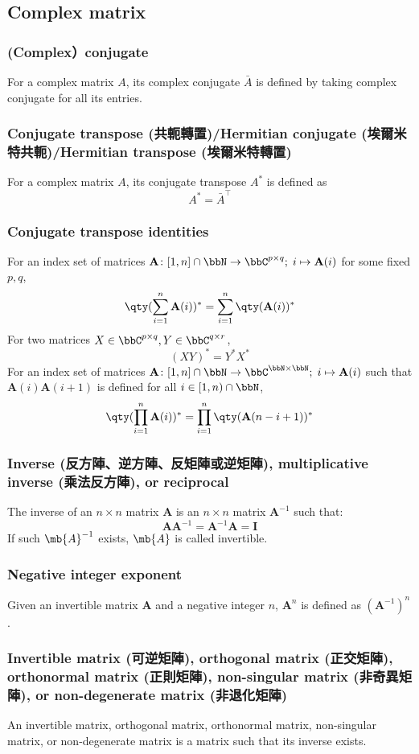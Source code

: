 \documentclass[a4paper,12pt]{report}
\begin{document}
\subsection{Complex matrix}
\subsubsection{(Complex）conjugate}
For a complex matrix $A$, its complex conjugate $\bar{A}$ is defined by taking complex conjugate for all its entries.
\subsubsection{Conjugate transpose (共軛轉置)/Hermitian conjugate (埃爾米特共軛)/Hermitian transpose (埃爾米特轉置)}
For a complex matrix $A$, its conjugate transpose $A^*$ is defined as
\[A^*=\bar{A}^\top\]
\subsubsection{Conjugate transpose identities}
For an index set of matrices $\mathbf{A}\colon[1,n]\cap\bbN\to\bbC^{p\times q};\;i\mapsto\mathbf{A}(i)$ for some fixed $p,q$,
\[\qty(\sum_{i=1}^n\mathbf{A}(i))^*=\sum_{i=1}^n\qty(\mathbf{A}(i))^*\]
For two matrices $X\in\bbC^{p\times q},Y\in\bbC^{q\times r}$,
\[(XY)^{*}=Y^{*}X^{*}\]
For an index set of matrices $\mathbf{A}\colon[1,n]\cap\bbN\to\bbC^{\bbN\times\bbN};\;i\mapsto\mathbf{A}(i)$ such that $\mathbf{A}(i)\mathbf{A}(i+1)$ is defined for all $i\in[1,n)\cap\bbN$,
\[\qty(\prod_{i=1}^n\mathbf{A}(i))^*=\prod_{i=1}^n\qty(\mathbf{A}(n-i+1))^*\]
\subsubsection{Inverse (反方陣、逆方陣、反矩陣或逆矩陣), multiplicative inverse (乘法反方陣), or reciprocal}
The inverse of an $n\times n$ matrix $\mathbf{A}$ is an $n\times n$ matrix $\mathbf{A}^{-1}$ such that:
\[\mathbf{A}\mathbf{A}^{-1}=\mathbf{A}^{-1}\mathbf{A}=\mathbf{I}\]
If such $\mb{A}^{-1}$ exists, $\mb{A}$ is called invertible.
\subsubsection{Negative integer exponent}
Given an invertible matrix $\mathbf{A}$ and a negative integer $n$, $\mathbf{A}^n$ is defined as $(\mathbf{A}^{-1})^n$.
\subsubsection{Invertible matrix (可逆矩陣), orthogonal matrix (正交矩陣), orthonormal matrix (正則矩陣), non-singular matrix (非奇異矩陣), or non-degenerate matrix (非退化矩陣)}
An invertible matrix, orthogonal matrix, orthonormal matrix, non-singular matrix, or non-degenerate matrix is a matrix such that its inverse exists.
\end{document}
